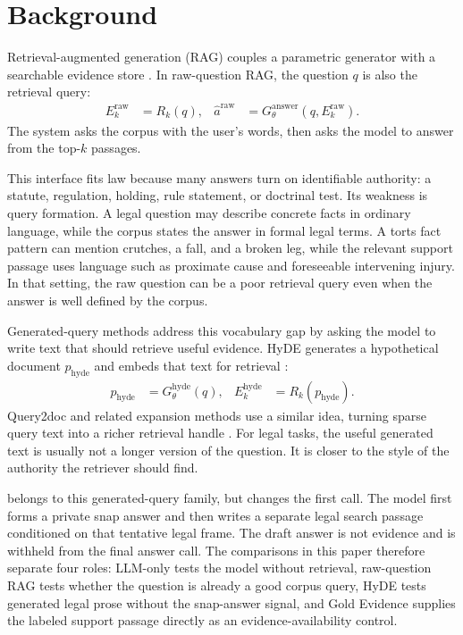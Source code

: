 \section{Background}\label{sec:background}\label{sec:preliminary}

Retrieval-augmented generation (RAG) couples a parametric generator with a
searchable evidence store \citep{lewis2020rag}. In raw-question RAG, the
question $q$ is also the retrieval query:
\begin{align}
E_k^{\mathrm{raw}} &= R_k(q),
&
\hat{a}^{\mathrm{raw}} &= G_{\theta}^{\mathrm{answer}}(q, E_k^{\mathrm{raw}}).
\end{align}
The system asks the corpus with the user's words, then asks the model to answer
from the top-$k$ passages.

This interface fits law because many answers turn on identifiable authority:
a statute, regulation, holding, rule statement, or doctrinal test. Its weakness
is query formation. A legal question may describe concrete facts in ordinary
language, while the corpus states the answer in formal legal terms. A torts
fact pattern can mention crutches, a fall, and a broken leg, while the relevant
support passage uses language such as proximate cause and foreseeable
intervening injury. In that setting, the raw question can be a poor retrieval
query even when the answer is well defined by the corpus.

Generated-query methods address this vocabulary gap by asking the model to
write text that should retrieve useful evidence. HyDE generates a hypothetical
document $p_{\mathrm{hyde}}$ and embeds that text for retrieval
\citep{gao2023hyde}:
\begin{align}
p_{\mathrm{hyde}} &= G_{\theta}^{\mathrm{hyde}}(q),
&
E_k^{\mathrm{hyde}} &= R_k(p_{\mathrm{hyde}}).
\end{align}
Query2doc and related expansion methods use a similar idea, turning sparse
query text into a richer retrieval handle \citep{wang2023query2doc}. For legal
tasks, the useful generated text is usually not a longer version of the
question. It is closer to the style of the authority the retriever should find.

\hyre{} belongs to this generated-query family, but changes the first call. The
model first forms a private snap answer and then writes a separate legal search
passage conditioned on that tentative legal frame. The draft answer is not
evidence and is withheld from the final answer call. The comparisons in this
paper therefore separate four roles: LLM-only tests the model without
retrieval, raw-question RAG tests whether the question is already a good corpus
query, HyDE tests generated legal prose without the snap-answer signal, and
Gold Evidence supplies the labeled support passage directly as an
evidence-availability control.

